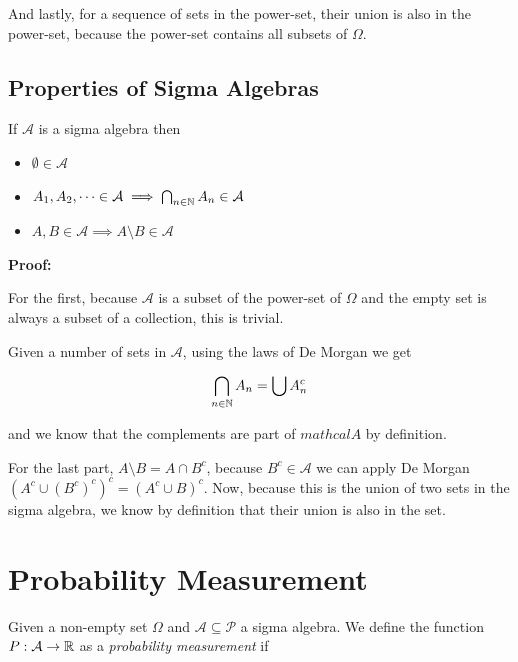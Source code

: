 And lastly, for a sequence of sets in the power-set, their union is also in the power-set, because the power-set 
contains all subsets of \(\Omega\).

\QED

\subsection{Properties of Sigma Algebras}

If \(\mathcal{A}\) is a sigma algebra then 

\begin{itemize}
    
    \item \(\emptyset \in \mathcal{A}\) 

    \item \(A_1, A_2, \dots \in \mathcal{A} \implies \bigcap_{n \in \mathbb{N}} A_n \in \mathcal{A}\)

    \item \(A, B \in \mathcal{A} \implies A \setminus B \in \mathcal{A}\)

\end{itemize}

\textbf{Proof:}

For the first, because \(\mathcal{A}\) is a subset of the power-set of \(\Omega\) and the empty set is 
always a subset of a collection, this is trivial. 

Given a number of sets in \(\mathcal{A}\), using the laws of De Morgan we get 

\[
    \bigcap_{n \in \mathbb{N}} A_n = \bigcup A_{n}^{c}
\]

and we know that the complements are part of \(mathcal{A}\) by definition. 

For the last part, \(A \setminus B = A \cap B^c\), because \(B^c \in \mathcal{A}\) we can apply De Morgan 
\((A^c \cup (B^c)^c)^c = (A^c \cup B)^c\). Now, because this is the union of two sets in the sigma algebra, we know by definition 
that their union is also in the set.

\QED

\section{Probability Measurement}

Given a non-empty set \(\Omega\) and \(\mathcal{A} \subseteq \mathcal{P}\) a sigma algebra. We define 
the function \(P:\mathcal{A} \to \mathbb{R}\) as a \emph{probability measurement} if 

